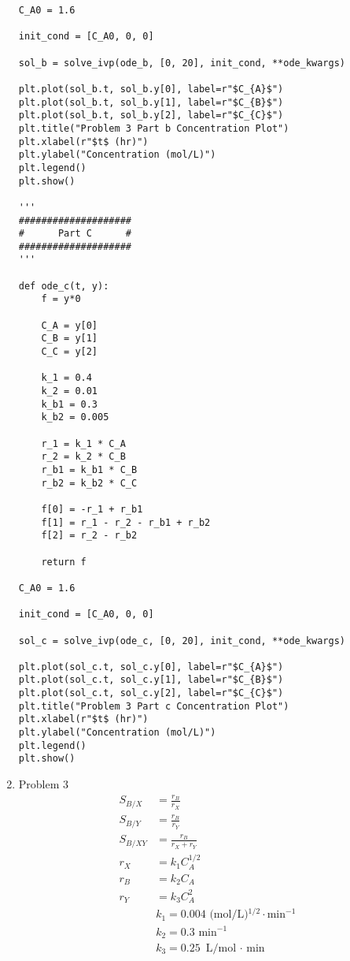 \documentclass[12pt]{article}
\begin{document}
\begin{enumerate}
\begin{verbatim}
C_A0 = 1.6

init_cond = [C_A0, 0, 0]

sol_b = solve_ivp(ode_b, [0, 20], init_cond, **ode_kwargs)

plt.plot(sol_b.t, sol_b.y[0], label=r"$C_{A}$")
plt.plot(sol_b.t, sol_b.y[1], label=r"$C_{B}$")
plt.plot(sol_b.t, sol_b.y[2], label=r"$C_{C}$")
plt.title("Problem 3 Part b Concentration Plot")
plt.xlabel(r"$t$ (hr)")
plt.ylabel("Concentration (mol/L)")
plt.legend()
plt.show()

'''
####################
#      Part C      #
####################
'''

def ode_c(t, y):
    f = y*0

    C_A = y[0]
    C_B = y[1]
    C_C = y[2]

    k_1 = 0.4
    k_2 = 0.01
    k_b1 = 0.3
    k_b2 = 0.005

    r_1 = k_1 * C_A
    r_2 = k_2 * C_B
    r_b1 = k_b1 * C_B
    r_b2 = k_b2 * C_C

    f[0] = -r_1 + r_b1
    f[1] = r_1 - r_2 - r_b1 + r_b2
    f[2] = r_2 - r_b2

    return f

C_A0 = 1.6

init_cond = [C_A0, 0, 0]

sol_c = solve_ivp(ode_c, [0, 20], init_cond, **ode_kwargs)

plt.plot(sol_c.t, sol_c.y[0], label=r"$C_{A}$")
plt.plot(sol_c.t, sol_c.y[1], label=r"$C_{B}$")
plt.plot(sol_c.t, sol_c.y[2], label=r"$C_{C}$")
plt.title("Problem 3 Part c Concentration Plot")
plt.xlabel(r"$t$ (hr)")
plt.ylabel("Concentration (mol/L)")
plt.legend()
plt.show()
\end{verbatim}

\newpage
    \item Problem 3
    \begin{align*}
        S_{B/X} &= \frac{r_B}{r_X} \\
        S_{B/Y} &= \frac{r_B}{r_Y} \\
        S_{B/XY} &= \frac{r_B}{r_X + r_Y} \\
        r_X &= k_1 C_A^{1/2} \\
        r_B &= k_2 C_A \\
        r_Y &= k_3 C_A^2 \\
        & k_1 = 0.004 \text{ (mol/L)$^{1/2} \cdot$min$^{-1}$} \\
        & k_2 = 0.3 \text{ min$^{-1}$} \\
        & k_3 = 0.25 \text{ L/mol $\cdot$ min}
    \end{align*}


\end{enumerate}
\end{document}

